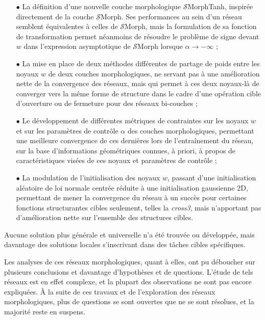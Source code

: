 \vspace{-3.6mm}
\begin{itemize}%
    \item[$\bullet$] La définition d'une nouvelle couche morphologique $\mathcal{S}$MorphTanh, inspirée directement de la couche $\mathcal{S}$Morph. Ses performances au sein d'un réseau semblent équivalentes à celles de $\mathcal{S}$Morph, mais la formulation de sa fonction de transformation permet néanmoins de résoudre le problème de signe devant $w$ dans l'expression asymptotique de $\mathcal{S}$Morph lorsque $\alpha \rightarrow -\infty$ ;
    
    \item[$\bullet$] La mise en place de deux méthodes différentes de partage de poids entre les noyaux $w$ de deux couches morphologiques, ne servant pas à une amélioration nette de la convergence des réseaux, mais qui permet à ces deux noyaux-là de converger vers la même forme de structure dans le cadre d'une opération cible d'ouverture ou de fermeture pour des réseaux bi-couches ;
    
    \item[$\bullet$] Le développement de différentes métriques de contraintes sur les noyaux $w$ et sur les paramètres de contrôle $\alpha$ des couches morphologiques, permettant une meilleure convergence de ces dernières lors de l'entraînement du réseau, sur la base d'informations géométriques connues, à priori, à propos de caractéristiques visées de ces noyaux et paramètres de contrôle ;
    
    \item[$\bullet$] La modulation de l'initialisation des noyaux $w$, passant d'une initialisation aléatoire de loi normale centrée réduite à une initialisation gaussienne 2D, permettant de mener la convergence du réseau à un succès pour certaines fonctions structurantes cibles seulement, telles la \textit{cross3}, mais n'apportant pas d'amélioration nette sur l'ensemble des structures cibles.
\end{itemize}

\vspace{1.0mm}
\noindent Aucune solution plus générale et universelle n'a été trouvée ou développée, mais davantage des solutions locales s'inscrivant dans des tâches cibles spécifiques.


\newpage

Les analyses de ces réseaux morphologiques, quant à elles, ont pu déboucher sur plusieurs conclusions et davantage d'hypothèses et de questions. L'étude de tels réseaux est en effet complexe, et la plupart des observations ne sont pas encore expliquées. À la suite de ces travaux et de l'exploration des réseaux morphologiques, plus de questions se sont ouvertes que ne se sont résolues, et la majorité reste en suspens. \\

